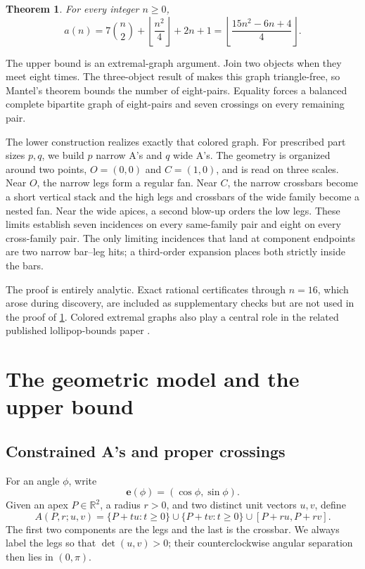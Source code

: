 \documentclass[11pt]{amsart}
\newtheorem{theorem}{Theorem}[section]
\theoremstyle{definition}
\newcommand{\R}{\mathbb R}
\newcommand{\evec}{\mathbf e}
\DeclareMathOperator{\detm}{det}
\begin{document}
\begin{theorem}\label{thm:main}
For every integer $n\ge0$,
\begin{equation}\label{eq:mainformula}
 a(n)=7\binom n2+\left\lfloor\frac{n^2}{4}\right\rfloor+2n+1
 =\left\lfloor\frac{15n^2-6n+4}{4}\right\rfloor.
\end{equation}
\end{theorem}

The upper bound is an extremal-graph argument.  Join two objects when they
meet eight times.  The three-object result of \cite{CKS2026} makes this
graph triangle-free, so Mantel's theorem bounds the number of eight-pairs.
Equality forces a balanced complete bipartite graph of eight-pairs and seven
crossings on every remaining pair.

The lower construction realizes exactly that colored graph.  For prescribed
part sizes $p,q$, we build $p$ narrow A's and $q$ wide A's.  The geometry is
organized around two points, $O=(0,0)$ and $C=(1,0)$, and is read on three
scales.  Near $O$, the narrow legs form a regular fan.  Near $C$, the narrow
crossbars become a short vertical stack and the high legs and crossbars of
the wide family become a nested fan.  Near the wide apices, a second blow-up
orders the low legs.  These limits establish seven incidences on every
same-family pair and eight on every cross-family pair.  The only limiting
incidences that land at component endpoints are two narrow bar--leg hits;
a third-order expansion places both strictly inside the bars.

The proof is entirely analytic.  Exact rational certificates through
$n=16$, which arose during discovery, are included as supplementary checks
but are not used in the proof of \cref{thm:main}.  Colored extremal graphs
also play a central role in the related published lollipop-bounds paper
\cite{MahajanChopra2026}.

\section{The geometric model and the upper bound}

\subsection{Constrained A's and proper crossings}

For an angle $\phi$, write
\[
 \evec(\phi)=(\cos\phi,\sin\phi).
\]
Given an apex $P\in\R^2$, a radius $r>0$, and two distinct unit vectors
$u,v$, define
\begin{equation}\label{eq:Adef}
 A(P,r;u,v)=
 \{P+tu:t\ge0\}\cup\{P+tv:t\ge0\}
 \cup[P+ru,P+rv].
\end{equation}
The first two components are the legs and the last is the crossbar.  We
always label the legs so that $\detm(u,v)>0$; their counterclockwise angular
separation then lies in $(0,\pi)$.
\end{document}
